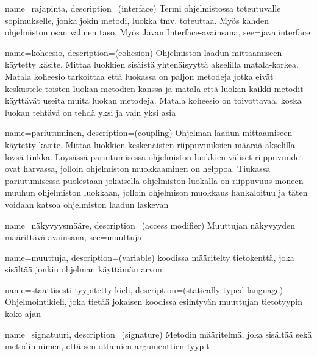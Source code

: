 {
    name=rajapinta,
    description={(interface) Termi ohjelmistossa toteutuvalle sopimukselle,
jonka jokin metodi, luokka tmv. toteuttaa. Myös kahden ohjelmiston osan välinen
taso. Myös Javan Interface-avainsana},
    see={java:interface}
}

{
    name=koheesio,
    description={(cohesion) Ohjelmiston laadun mittaamiseen käytetty käsite.
Mittaa luokkien sisäistä yhtenäisyyttä akselilla matala-korkea. Matala koheesio
tarkoittaa että luokassa on paljon metodeja jotka eivät keskustele toisten
luokan metodien kanssa ja matala että luokan kaikki metodit käyttävät useita
muita luokan metodeja. Matala koheesio on toivottavaa, koska luokan tehtävä
on tehdä yksi ja vain yksi asia}
}

{
    name=pariutuminen,
    description={(coupling) Ohjelman laadun mittaamiseen käytetty käsite.
Mittaa luokkien keskenäisten riippuvuuksien määrää akselilla löysä-tiukka.
Löysässä pariutumisessa ohjelmiston luokkien väliset riippuvuudet ovat
harvassa, jolloin ohjelmiston muokkaaminen on helppoa. Tiukassa pariutumisessa
puolestaan jokaisella ohjelmiston luokalla on riippuvuus moneen muuhun
ohjelmiston luokkaan, jolloin ohjelmison muokkaus hankaloituu ja täten voidaan
katsoa ohjelmiston laadun laskevan}
}


{
    name=näkyvyysmääre,
    description={(access modifier) Muuttujan näkyvyyden määrittävä avainsana},
    see=muuttuja
}

{
    name=muuttuja,
    description={(variable) koodissa määritelty tietokenttä, joka sisältää jonkin ohjelman
käyttämän arvon}
}

{
    name=staattisesti tyypitetty kieli,
    description={(statically typed language) Ohjelmointikieli, joka tietää jokaisen koodissa
esiintyvän muuttujan tietotyypin koko ajan}
}

{
	name=signatuuri,
	description={(signature) Metodin määritelmä, joka sisältää sekä metodin nimen, että sen
ottamien argumenttien tyypit}
}

